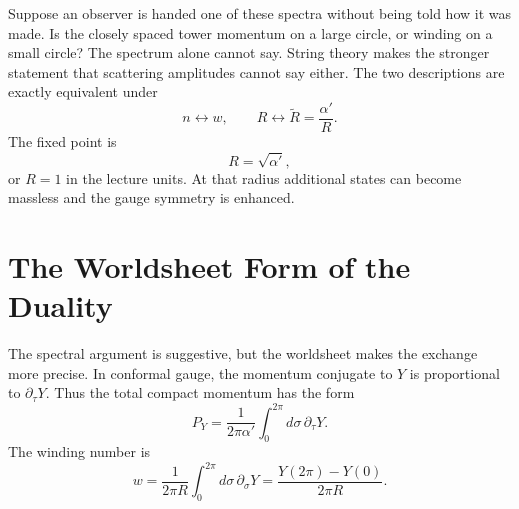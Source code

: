 Suppose an observer is handed one of these spectra without being told how it
was made.  Is the closely spaced tower momentum on a large circle, or
winding on a small circle?  The spectrum alone cannot say.  String theory
makes the stronger statement that scattering amplitudes cannot say either.
The two descriptions are exactly equivalent under
\begin{equation}
  n\longleftrightarrow w,
  \qquad
  R\longleftrightarrow \widetilde R=\frac{\alpha'}{R}.
  \label{eq:l10-radius-duality}
\end{equation}
The fixed point is
\begin{equation}
  R=\sqrt{\alpha'},
  \label{eq:l10-self-dual-radius}
\end{equation}
or \(R=1\) in the lecture units.  At that radius additional states can
become massless and the gauge symmetry is enhanced.

\begin{classroomqa}
\end{classroomqa}

\begin{classroomqa}
\end{classroomqa}

\section{The Worldsheet Form of the Duality}

The spectral argument is suggestive, but the worldsheet makes the exchange
more precise.  In conformal gauge, the momentum conjugate to \(Y\) is
proportional to \(\partial_\tau Y\).  Thus the total compact momentum has
the form
\begin{equation}
  P_Y=\frac{1}{2\pi\alpha'}
      \int_0^{2\pi}d\sigma\,\partial_\tau Y.
  \label{eq:l10-worldsheet-momentum}
\end{equation}
The winding number is
\begin{equation}
  w=\frac{1}{2\pi R}
      \int_0^{2\pi}d\sigma\,\partial_\sigma Y
   =\frac{Y(2\pi)-Y(0)}{2\pi R}.
  \label{eq:l10-worldsheet-winding}
\end{equation}

